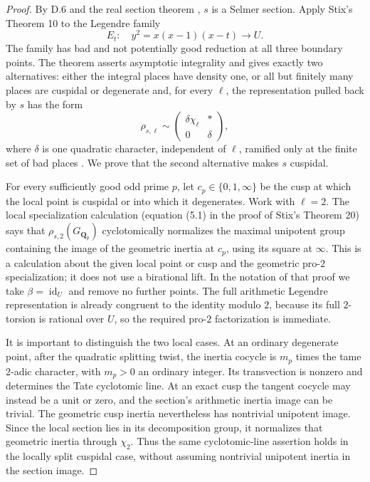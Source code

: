 \begin{proof}
By D.6 and the real section theorem
\cite[Corollary 3.13]{D_Mochizuki2003Real}, $s$ is a Selmer
section.  Apply Stix's Theorem 10 to the Legendre family
\[
 E_t:\quad y^2=x(x-1)(x-t)\longrightarrow U.
\]
The family has bad and not potentially good reduction at all
three boundary points.  The theorem asserts asymptotic
integrality and gives exactly two alternatives: either the
integral places have density one, or all but finitely many
places are cuspidal or degenerate and, for every $\ell$, the
representation pulled back by $s$ has the form
\[
 \rho_{s,\ell}\sim
 \begin{pmatrix}\delta\chi_\ell&*\\0&\delta\end{pmatrix},
 \tag{D.25.2}
\]
where $\delta$ is one quadratic character, independent of
$\ell$, ramified only at the finite set of bad places
\cite[Theorem 10]{D_Stix2015}.  We prove that the second
alternative makes $s$ cuspidal.

For every sufficiently good odd prime $p$, let
$c_p\in\{0,1,\infty\}$ be the cusp at which the local point
is cuspidal or into which it degenerates.  Work with $\ell=2$.
The local specialization calculation (equation (5.1) in the
proof of Stix's Theorem 20) says that $\rho_{s,2}(G_{\mathbf Q_p})$
cyclotomically normalizes the maximal unipotent group containing
the image of the geometric inertia at $c_p$, using its square
at $\infty$.  This is a calculation about the given local
point or cusp and the geometric pro-$2$ specialization; it
does not use a birational lift.  In the notation of that proof
we take $\beta=\operatorname{id}_U$ and remove no further
points.  The full arithmetic Legendre representation is already
congruent to the identity modulo $2$, because its full
$2$-torsion is rational over $U$, so the required pro-$2$
factorization is immediate.

It is important to distinguish the two local cases.  At an
ordinary degenerate point, after the quadratic splitting twist,
the inertia cocycle is $m_p$ times the tame $2$-adic character,
with $m_p>0$ an ordinary integer.  Its transvection is nonzero
and determines the Tate cyclotomic line.  At an exact cusp the
tangent cocycle may instead be a unit or zero, and the section's
arithmetic inertia image can be trivial.  The geometric cusp
inertia nevertheless has nontrivial unipotent image.  Since
the local section lies in its decomposition group, it
normalizes that geometric inertia through $\chi_2$.  Thus the
same cyclotomic-line assertion holds in the locally split
cuspidal case, without assuming nontrivial unipotent inertia
in the section image.


\end{proof}
